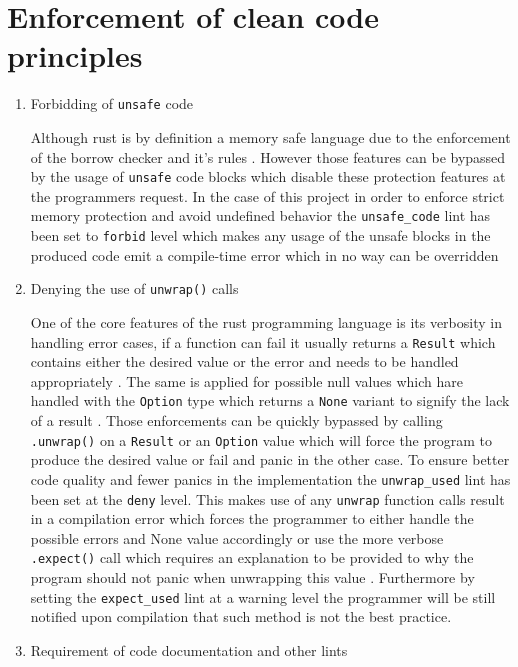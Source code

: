 \section{Enforcement of clean code principles}
\begin{enumerate}
    \item Forbidding of \verb|unsafe| code
    
    Although rust is by definition a memory safe language due to the enforcement of the borrow checker and it's rules \cite{TODO}. However those features can be bypassed by the usage of \verb|unsafe| code blocks which disable these protection features at the programmers request.
    In the case of this project in order to enforce strict memory protection and avoid undefined behavior the \verb|unsafe_code| lint has been set to \verb|forbid| level which makes any usage of the unsafe blocks in the produced code emit a compile-time error which in no way can be overridden \cite{TODO - rust book}

    \item  Denying the use of \verb|unwrap()| calls

    One of the core features of the rust programming language is its verbosity in handling error cases, if a function can fail it usually returns a \verb|Result| which contains either the desired value or the error and needs to be handled appropriately \cite{TODO}. The same is applied for possible null values which hare handled with the \verb|Option| type which returns a \verb|None| variant to signify the lack of a result \cite{TODO}. 
    Those enforcements can be quickly bypassed by calling \verb|.unwrap()| on a \verb|Result| or an \verb|Option| value which will force the program to produce the desired value or fail and panic in the other case.
    To ensure better code quality and fewer panics in the implementation the \verb|unwrap_used| lint has been set at the \verb|deny| level. 
    This makes use of any \verb|unwrap| function calls result in a compilation error which forces the programmer to either handle the possible errors and None value accordingly or use the more verbose \verb|.expect()| call which requires an explanation to be provided to why the program should not panic when unwrapping this value \cite{TODO rust book}. 
    Furthermore by setting the \verb|expect_used| lint at a warning level the programmer will be still notified upon compilation that such method is not the best practice.

    \item Requirement of code documentation and other lints


\end{enumerate}

